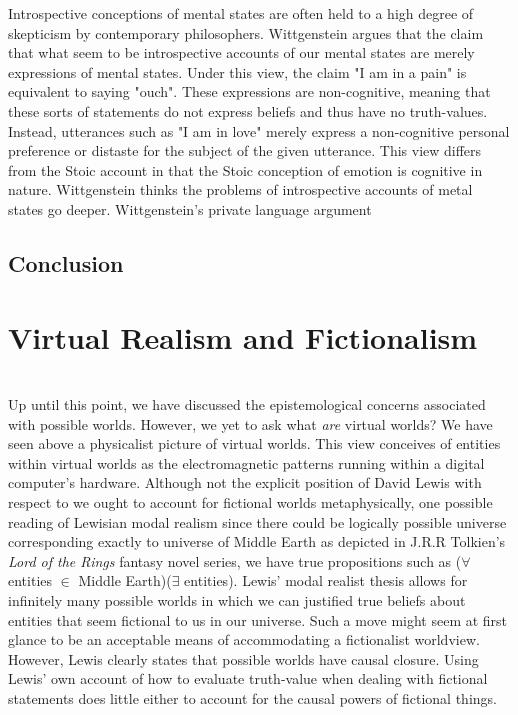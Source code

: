 Introspective conceptions of mental states are often held to a high degree of skepticism by contemporary philosophers. Wittgenstein argues that the claim that what seem to be introspective accounts of our mental states are merely expressions of mental states. \cite{wittgenstein2009philosophische} Under this view, the claim "I am in a pain" is equivalent to saying "ouch". These expressions are non-cognitive, meaning that these sorts of statements do not express beliefs and thus have no truth-values. Instead, utterances such as  "I am in love" merely express a non-cognitive personal preference or distaste for the subject of the given utterance. This view differs from the Stoic account in that the Stoic conception of emotion is cognitive in nature. Wittgenstein thinks the problems of introspective accounts of metal states go deeper. Wittgenstein's private language argument  
\subsection{Conclusion}

\section{Virtual Realism and Fictionalism}



 \\
 
  
 
Up until this point, we have discussed the epistemological concerns associated with possible worlds. However, we yet to ask what \textit{are} virtual worlds? We have seen above a physicalist picture of virtual worlds. This view conceives of entities within virtual worlds as the electromagnetic patterns running within a digital computer's hardware. 
Although not the explicit position of David Lewis with respect to we ought to account for fictional worlds metaphysically, one possible reading of Lewisian modal realism  since there could be logically possible universe corresponding exactly to universe of Middle Earth as depicted in J.R.R Tolkien's \textit{Lord of the Rings} fantasy novel series, we have true propositions such as ($\forall $entities $\in$ Middle Earth)($\exists$ entities). Lewis' modal realist thesis allows for infinitely many possible worlds in which we can justified true beliefs about entities that seem fictional to us in our universe. Such a move might seem at first glance to be an acceptable means of 
accommodating a fictionalist worldview. However, Lewis clearly states that possible worlds have causal closure. Using Lewis' own account of how to evaluate truth-value when dealing with fictional statements does little either to account for the causal powers of fictional things.  



